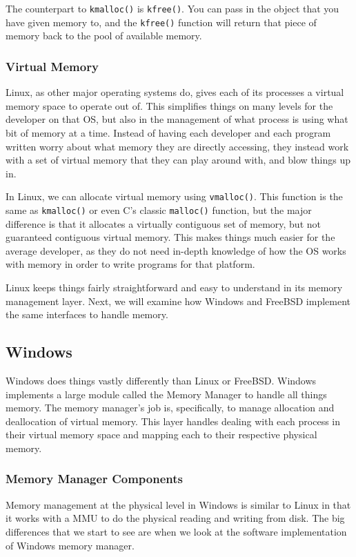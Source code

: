 \documentclass[10pt,letterpaper,onecolumn,draftclsnofoot]{IEEEtran}
\begin{document}
The counterpart to \texttt{kmalloc()} is \texttt{kfree()}. You can pass
in the object that you have given memory to, and the \texttt{kfree()} function
will return that piece of memory back to the pool of available memory.

\subsubsection{Virtual Memory}
Linux, as other major operating systems do, gives each of its processes
a virtual memory space to operate out of. This simplifies things on many
levels for the developer on that OS, but also in the management of what
process is using what bit of memory at a time. Instead of having each
developer and each program written worry about what memory they are
directly accessing, they instead work with a set of virtual memory that
they can play around with, and blow things up in.

In Linux, we can allocate virtual memory using \texttt{vmalloc()}. This
function is the same as \texttt{kmalloc()} or even C's classic \texttt{malloc()}
function, but the major difference is that it allocates a virtually
contiguous set of memory, but not guaranteed contiguous virtual memory.
This makes things much easier for the average developer, as they do not
need in-depth knowledge of how the OS works with memory in order to write
programs for that platform.

Linux keeps things fairly straightforward and easy to understand in its
memory management layer. Next, we will examine how Windows and FreeBSD
implement the same interfaces to handle	memory.
\subsection{Windows}
Windows does things vastly differently than Linux or FreeBSD. Windows implements
a large module called the Memory Manager to handle all things memory. The memory
manager's job is, specifically, to manage allocation and deallocation of virtual
memory. This layer handles dealing with each process in their virtual memory space
and mapping each to their respective physical memory.
\subsubsection{Memory Manager Components}
Memory management at the physical level in Windows is similar to Linux in that it
works with a MMU to do the physical reading and writing from disk. The big
differences that we start to see are when we look at the software implementation
of Windows memory manager.
\end{document}
